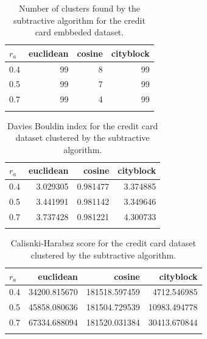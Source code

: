 \documentclass[conference]{IEEEtran}
\begin{document}
\begin{itemize}
    \begin{table}[ht!]
        \centering
        \begin{tabular}{lrrr}
        \toprule
        $r_a$ &  euclidean &  cosine &  cityblock \\
        \midrule
        0.4 &         99 &       8 &         99 \\
        0.5 &         99 &       7 &         99 \\
        0.7 &         99 &       4 &         99 \\
        \bottomrule \\
        \end{tabular}
        \caption{Number of clusters found by the subtractive algorithm for the credit card embbeded dataset.}
        \label{tab:ce_n_s}
    \end{table}
    
    \begin{table}[ht!]
        \centering
        \begin{tabular}{lrrr}
        \toprule
        $r_a$ &  euclidean &    cosine &  cityblock \\
        \midrule
        0.4 &   3.029305 &  0.981477 &   3.374885 \\
        0.5 &   3.441991 &  0.981142 &   3.349646 \\
        0.7 &   3.737428 &  0.981221 &   4.300733 \\
        \bottomrule \\
        \end{tabular}
        \caption{Davies Bouldin index for the credit card dataset clustered by the subtractive algorithm.}
        \label{tab:c1_db_s}
    \end{table}
    
    \begin{table}[ht!]
        \centering
        \begin{tabular}{lrrr}
        \toprule
        $r_a$ &     euclidean &         cosine &     cityblock \\
        \midrule
        0.4 &  34200.815670 &  181518.597459 &   4712.546985 \\
        0.5 &  45858.080636 &  181504.729539 &  10983.494778 \\
        0.7 &  67334.688094 &  181520.031384 &  30413.670844 \\
        \bottomrule \\
        \end{tabular}
        \caption{Calisnki-Harabsz score for the credit card dataset clustered by the subtractive algorithm.}
        \label{tab:c1_ch_s}
    \end{table}
    

\end{itemize}
\end{document}
